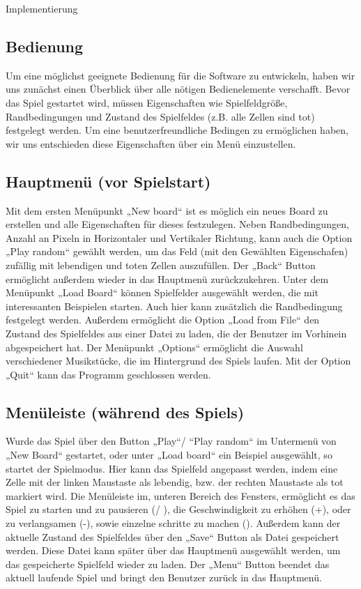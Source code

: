 \documentclass[runningheads]{llncs}
\begin{document}
\begin{section}{Implementierung}
      
    \section{Bedienung}
        Um eine möglichst geeignete Bedienung für die Software zu entwickeln,
        haben wir uns zunächst einen Überblick über alle nötigen Bedienelemente verschafft.
        Bevor das Spiel gestartet wird, müssen Eigenschaften wie Spielfeldgröße,
        Randbedingungen und Zustand des Spielfeldes (z.B. alle Zellen sind tot) festgelegt werden.
        Um eine benutzerfreundliche Bedingen zu ermöglichen haben,
        wir uns entschieden diese Eigenschaften über ein Menü einzustellen.
	\subsection{Hauptmenü (vor Spielstart)}
        Mit dem ersten Menüpunkt „New board“ ist es möglich ein neues Board zu erstellen und alle Eigenschaften für dieses festzulegen. Neben Randbedingungen,
        Anzahl an Pixeln in Horizontaler und Vertikaler Richtung, kann auch die Option „Play random“ gewählt werden,
        um das Feld (mit den Gewählten Eigenschafen) zufällig mit lebendigen und toten Zellen auszufüllen. Der „Back“ Button ermöglicht außerdem wieder in das Hauptmenü zurückzukehren. \newline
        Unter dem Menüpunkt „Load Board“ können Spielfelder ausgewählt werden, die mit interessanten Beispielen starten. Auch hier kann zusätzlich die Randbedingung festgelegt werden.
        Außerdem ermöglicht die Option „Load from File“ den Zustand des Spielfeldes aus einer Datei zu laden, die der Benutzer im Vorhinein abgespeichert hat. 
        Der Menüpunkt „Options“ ermöglicht die Auswahl verschiedener Musikstücke, die im Hintergrund des Spiels laufen. Mit der Option „Quit“ kann das Programm geschlossen werden.
	\subsection{Menüleiste (während des Spiels)}
        Wurde das Spiel über den Button „Play“/ “Play random“ im Untermenü von „New Board“ gestartet, oder unter „Load board“ ein Beispiel ausgewählt, so startet der Spielmodus.
        Hier kann das Spielfeld angepasst werden, indem eine Zelle mit der linken Maustaste als lebendig, bzw. der rechten Maustaste als tot markiert wird. \newline
        Die Menüleiste im, unteren Bereich des Fensters, ermöglicht es das Spiel zu starten und zu pausieren (/ ),
        die Geschwindigkeit zu erhöhen (+), oder zu verlangsamen (-), sowie einzelne schritte zu machen ().
        Außerdem kann der aktuelle Zustand des Spielfeldes über den „Save“ Button als Datei gespeichert werden.
        Diese Datei kann später über das Hauptmenü ausgewählt werden, um das gespeicherte Spielfeld wieder zu laden.
        Der „Menu“ Button beendet das aktuell laufende Spiel und bringt den Benutzer zurück in das Hauptmenü. 

\end{section}
\end{document}
